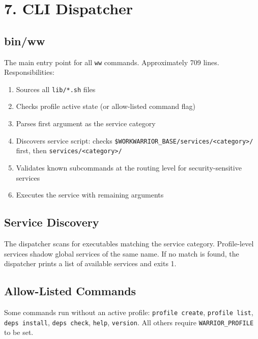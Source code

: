 \documentclass[
]{article}
\providecommand{\tightlist}{%
  \setlength{\itemsep}{0pt}\setlength{\parskip}{0pt}}
\begin{document}
\section{7. CLI Dispatcher}\label{cli-dispatcher}

\subsection{bin/ww}\label{binww}

The main entry point for all \texttt{ww} commands. Approximately 709
lines. Responsibilities:

\begin{enumerate}
\def\labelenumi{\arabic{enumi}.}
\tightlist
\item
  Sources all \texttt{lib/*.sh} files
\item
  Checks profile active state (or allow-listed command flag)
\item
  Parses first argument as the service category
\item
  Discovers service script: checks
  \texttt{\$WORKWARRIOR\_BASE/services/\textless{}category\textgreater{}/}
  first, then \texttt{services/\textless{}category\textgreater{}/}
\item
  Validates known subcommands at the routing level for
  security-sensitive services
\item
  Executes the service with remaining arguments
\end{enumerate}

\subsection{Service Discovery}\label{service-discovery}

The dispatcher scans for executables matching the service category.
Profile-level services shadow global services of the same name. If no
match is found, the dispatcher prints a list of available services and
exits 1.

\subsection{Allow-Listed Commands}\label{allow-listed-commands}

Some commands run without an active profile: \texttt{profile\ create},
\texttt{profile\ list}, \texttt{deps\ install}, \texttt{deps\ check},
\texttt{help}, \texttt{version}. All others require
\texttt{WARRIOR\_PROFILE} to be set.
\end{document}
